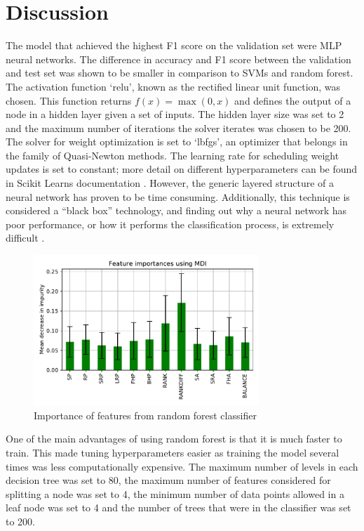 \section{Discussion} \label{discussion}
The model that achieved the highest F1 score on the validation set were MLP neural networks. The difference in accuracy and F1 score between the validation and test set was shown to be smaller in comparison to SVMs and random forest.
The activation function `relu', known as the rectified linear unit function, was chosen. This function returns $f(x) = \max{(0,x)}$ and defines the output of a node in a hidden layer given a set of inputs. The hidden layer size was set to 2 and the maximum number of iterations the solver iterates was chosen to be 200. The solver for weight optimization is set to `lbfgs', an optimizer that belongs in the family of Quasi-Newton methods. The learning rate for scheduling weight updates is set to constant; more detail on different hyperparameters can be found in Scikit Learns documentation \cite{pedregosa2011scikit}. However, the generic layered structure of a neural network has proven to be time consuming. Additionally, this technique is considered a ``black box'' technology, and finding out why a neural network has poor performance, or how it performs the classification process, is extremely difficult \cite{noriega2005multilayer}.

\begin{figure}[ht]

\includegraphics[width=8.5cm]{plots/feature_importance.pdf}
\caption{Importance of features from random forest classifier}

\label{fig4}
\centering
\end{figure}

One of the main advantages of using random forest is that it is much faster to train. This made tuning hyperparameters easier as training the model several times was less computationally expensive. The maximum number of levels in each decision tree was set to 80, the maximum number of features considered for splitting a node was set to 4, the minimum number of data points allowed in a leaf node was set to 4 and the number of trees that were in the classifier was set to 200.

